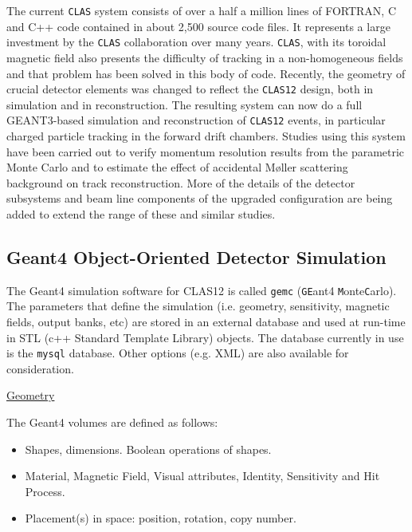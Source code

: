The current {\tt CLAS} system consists of over a half a million lines of 
FORTRAN, C and C++ code contained in about 2,500 source code files. It 
represents a large investment by the {\tt CLAS} collaboration over many 
years. {\tt CLAS}, with its toroidal magnetic field also presents the 
difficulty of tracking in a non-homogeneous fields and that problem has 
been solved in this body of code. Recently, the geometry of crucial detector 
elements was changed to reflect the {\tt CLAS12} design, both in simulation 
and in reconstruction. The resulting system can now do a full GEANT3-based 
simulation and reconstruction of {\tt CLAS12} events, in particular charged 
particle tracking in the forward drift chambers. Studies using this system 
have been carried out to verify momentum resolution results from the 
parametric Monte Carlo and to estimate the effect of accidental M{\o}ller 
scattering background on track reconstruction. More of the details of the 
detector subsystems and beam line components of the upgraded configuration 
are being added to extend the range of these and similar studies.

\vskip 0.5cm

\subsection{Geant4 Object-Oriented Detector Simulation}

The Geant4 simulation software for CLAS12 is called {\tt gemc} ({\tt GE}ant4 {\tt M}onte{\tt C}arlo).
The parameters that define the simulation (i.e. geometry, sensitivity, magnetic fields, output banks, etc)
are stored in an external database and used at run-time in STL (c++ Standard Template Library) objects.
The database currently in use is the {\tt mysql} database. Other options (e.g. XML) are also available for consideration.

\vskip 0.5cm

\underline{Geometry}
\vskip 0.5cm

\noindent
The Geant4 volumes are defined as follows:

\noindent
\begin{itemize}
\item Shapes, dimensions. Boolean operations of shapes.
\item Material, Magnetic Field, Visual attributes, Identity, Sensitivity and Hit Process.
\item Placement(s) in space: position, rotation, copy number.
\end{itemize}

